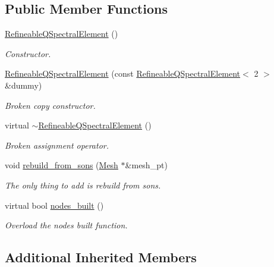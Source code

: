 \subsection*{Public Member Functions}
\begin{DoxyCompactItemize}
\item 
\hyperlink{classoomph_1_1RefineableQSpectralElement_3_012_01_4_aa061063e931d2b908a1fcee4b33d692a}{Refineable\+Q\+Spectral\+Element} ()
\begin{DoxyCompactList}\small\item\em Constructor. \end{DoxyCompactList}\item 
\hyperlink{classoomph_1_1RefineableQSpectralElement_3_012_01_4_ae2a3e149e0ffebea81096e676a384d0e}{Refineable\+Q\+Spectral\+Element} (const \hyperlink{classoomph_1_1RefineableQSpectralElement}{Refineable\+Q\+Spectral\+Element}$<$ 2 $>$ \&dummy)
\begin{DoxyCompactList}\small\item\em Broken copy constructor. \end{DoxyCompactList}\item 
virtual \hyperlink{classoomph_1_1RefineableQSpectralElement_3_012_01_4_a2812f01abe60b992110a14c5f73b705f}{$\sim$\+Refineable\+Q\+Spectral\+Element} ()
\begin{DoxyCompactList}\small\item\em Broken assignment operator. \end{DoxyCompactList}\item 
void \hyperlink{classoomph_1_1RefineableQSpectralElement_3_012_01_4_a46a713943b11c207d06a677bfe1cf162}{rebuild\+\_\+from\+\_\+sons} (\hyperlink{classoomph_1_1Mesh}{Mesh} $\ast$\&mesh\+\_\+pt)
\begin{DoxyCompactList}\small\item\em The only thing to add is rebuild from sons. \end{DoxyCompactList}\item 
virtual bool \hyperlink{classoomph_1_1RefineableQSpectralElement_3_012_01_4_a3437e444db1a3d4000ce6c9f73102206}{nodes\+\_\+built} ()
\begin{DoxyCompactList}\small\item\em Overload the nodes built function. \end{DoxyCompactList}\end{DoxyCompactItemize}
\subsection*{Additional Inherited Members}


